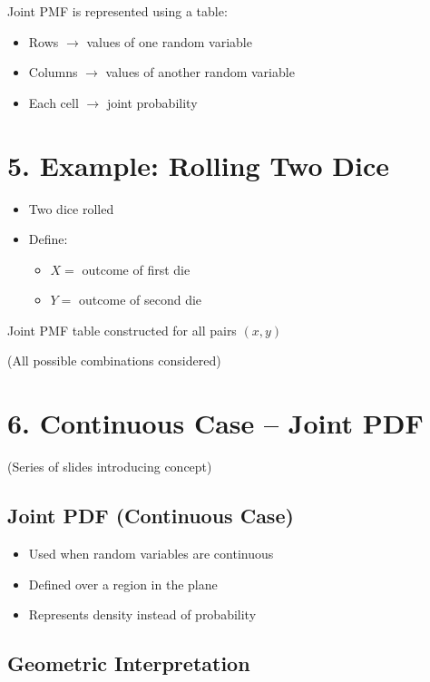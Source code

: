 \documentclass[12pt]{article}
\begin{document}
Joint PMF is represented using a table:
\begin{itemize}
    \item Rows $\rightarrow$ values of one random variable
    \item Columns $\rightarrow$ values of another random variable
    \item Each cell $\rightarrow$ joint probability
\end{itemize}

\section*{5. Example: Rolling Two Dice}

\begin{itemize}
    \item Two dice rolled
    \item Define:
    \begin{itemize}
        \item $X =$ outcome of first die
        \item $Y =$ outcome of second die
    \end{itemize}
\end{itemize}

Joint PMF table constructed for all pairs $(x, y)$

(All possible combinations considered)

\section*{6. Continuous Case -- Joint PDF}

(Series of slides introducing concept)

\subsection*{Joint PDF (Continuous Case)}

\begin{itemize}
    \item Used when random variables are continuous
    \item Defined over a region in the plane
    \item Represents density instead of probability
\end{itemize}

\subsection*{Geometric Interpretation}
\end{document}
